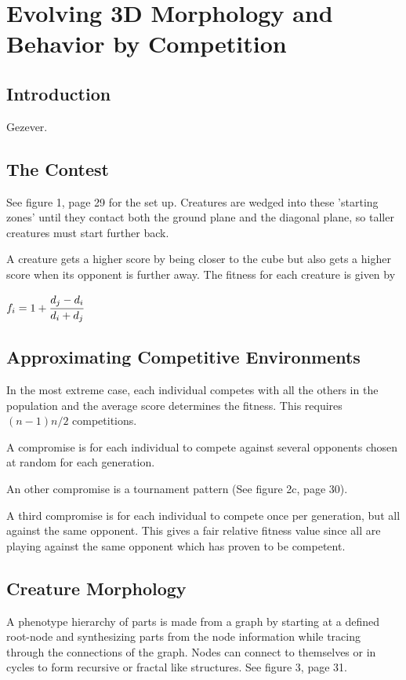 \documentclass[12pt]{article}
\begin{document}
\section{Evolving 3D Morphology and Behavior by Competition}
\subsection{Introduction}
Gezever.

\subsection{The Contest}
See figure 1, page 29 for the set up. Creatures are wedged into these 'starting zones' until they contact both the ground plane and the diagonal plane, so taller creatures must start further back.

A creature gets a higher score by being closer to the cube but also gets a higher score when its opponent is further away. The fitness for each creature is given by
\begin{center}
$f_i = 1 + \cfrac{d_j - d_i}{d_i + d_j}$
\end{center}

\subsection{Approximating Competitive Environments}
In the most extreme case, each individual competes with all the others in the population and the average score determines the fitness. This requires $(n-1)n/2$ competitions.

A compromise is for each individual to compete against several opponents chosen at random for each generation.

An other compromise is a tournament pattern (See figure 2c, page 30).

A third compromise is for each individual to compete once per generation, but all against the same opponent. This gives a fair relative fitness value since all are playing against the same opponent which has proven to be competent.

\subsection{Creature Morphology}
A phenotype hierarchy of parts is made from a graph by starting at a defined root-node and synthesizing parts from the node information while tracing through the connections of the graph. Nodes can connect to themselves or in cycles to form recursive or fractal like structures. See figure 3, page 31.
\end{document}
